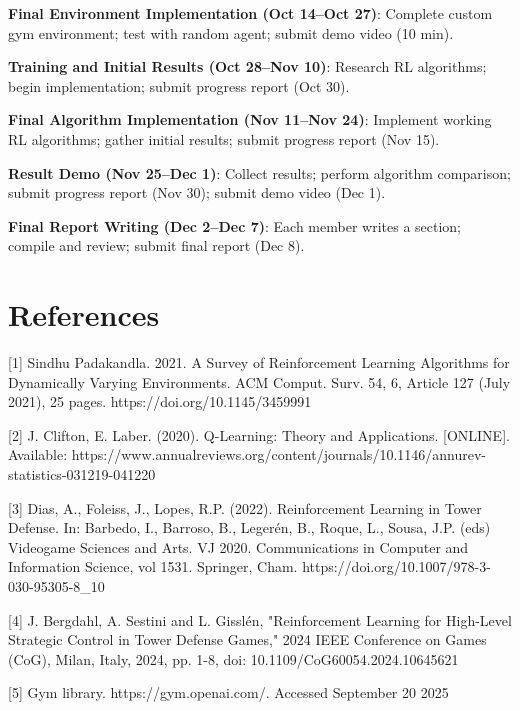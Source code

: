 \documentclass[12pt]{article}
\begin{document}
\textbf{Final Environment Implementation (Oct 14--Oct 27)}: Complete custom gym environment; test with random agent; submit demo video (10 min). 

\textbf{Training and Initial Results (Oct 28--Nov 10)}: Research RL algorithms; begin implementation; submit progress report (Oct 30). 

\textbf{Final Algorithm Implementation (Nov 11--Nov 24)}: Implement working RL algorithms; gather initial results; submit progress report (Nov 15). 

\textbf{Result Demo (Nov 25--Dec 1)}: Collect results; perform algorithm comparison; submit progress report (Nov 30); submit demo video (Dec 1). 

\textbf{Final Report Writing (Dec 2--Dec 7)}: Each member writes a section; compile and review; submit final report (Dec 8).


\vspace{0.5em}

\section*{References}

[1] Sindhu Padakandla. 2021. A Survey of Reinforcement Learning Algorithms for Dynamically Varying Environments. ACM Comput. Surv. 54, 6, Article 127 (July 2021), 25 pages.
https://doi.org/10.1145/3459991 \par

[2] J. Clifton, E. Laber. (2020). Q-Learning: Theory and Applications. [ONLINE]. Available: https://www.annualreviews.org/content/journals/10.1146/annurev-statistics-031219-041220 \par

[3] Dias, A., Foleiss, J., Lopes, R.P. (2022). Reinforcement Learning in Tower Defense. In: Barbedo, I., Barroso, B., Legerén, B., Roque, L., Sousa, J.P. (eds) Videogame Sciences and Arts. VJ 2020. Communications in Computer and Information Science, vol 1531. Springer, Cham. https://doi.org/10.1007/978-3-030-95305-8\_10 \par 

[4] J. Bergdahl, A. Sestini and L. Gisslén, "Reinforcement Learning for High-Level Strategic Control in Tower Defense Games," 2024 IEEE Conference on Games (CoG), Milan, Italy, 2024, pp. 1-8, doi: 10.1109/CoG60054.2024.10645621 \par

[5] Gym library. https://gym.openai.com/. Accessed September 20 2025
\end{document}
